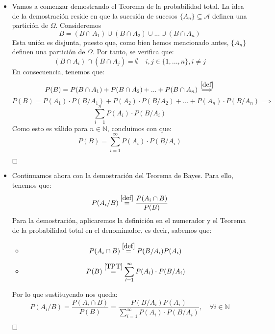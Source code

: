 \documentclass[a4paper, 12pt]{article}
\theoremstyle{plain}
\theoremstyle{definition}
\theoremstyle{remark}
\begin{document}
	\begin{itemize}
		\item Vamos a comenzar demostrando el Teorema de la probabilidad total. La idea de la demostración reside en que la sucesión de sucesos $\{A_n\}\subseteq \mathcal{A}$ definen una partición de $\Omega$. Consideremos
			\[B=(B\cap A_1)\cup (B\cap A_2)\cup ... \cup (B\cap A_n)\]
		Esta unión es disjunta, puesto que, como bien hemos mencionado antes, $\{A_n\}$ definen una partición de $\Omega$. Por tanto, se verifica que:
			\[(B\cap A_i)\cap (B\cap A_j)=\emptyset \quad i,j\in \{1,...,n\},i\not=j\]
		En consecuencia, tenemos que:
			\[P(B)=P(B\cap A_1)+P(B\cap A_2)+...+P(B\cap A_n)\overset{\ref{def}}{\implies}\]
			\[P(B)=P(A_1)\cdot P(B/A_1)+P(A_2)\cdot P(B/A_2)+...+P(A_n)\cdot P(B/A_n)\implies\]
			\[\sum_{i=1}^{n}P(A_i)\cdot P(B/A_i)\]
		Como esto es válido para $n\in \mathbb{N}$, concluimos con que:
			\[P(B)=\sum_{i=1}^{\infty}P(A_i)\cdot P(B/A_i)\]
			
		$\hfill\square$
		\item Continuamos ahora con la demostración del Teorema de Bayes. Para ello, tenemos que:
			\[P(A_i/B)\overset{\ref{def}}{=}\frac{P(A_i\cap B)}{P(B)}\]
		Para la demostración, aplicaremos la definición en el numerador y el Teorema de la probabilidad total en el denominador, es decir, sabemos que:
		\begin{itemize}
			\item \[P(A_i\cap B)\overset{\ref{def}}{=}P(B/A_i)P(A_i)\]
			\item \[P(B)\overset{\ref{TPT}}{=}\sum_{i=1}^{\infty}P(A_i)\cdot P(B/A_i)\]
		\end{itemize}
		Por lo que sustituyendo nos queda:
			\[P(A_i/B)=\frac{P(A_i\cap B)}{P(B)}=\frac{P(B/A_i)P(A_i)}{\sum_{i=1}^{\infty}P(A_i)\cdot P(B/A_i)}, \quad \forall i\in \mathbb{N}\]
			
		$\hfill\square$
	\end{itemize}
\end{document}

